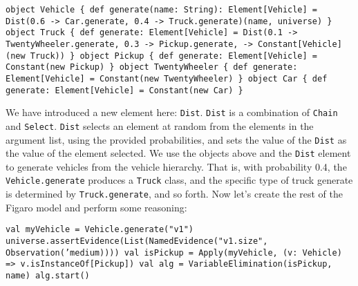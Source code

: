 \begin{flushleft}
\texttt{object Vehicle \{
\newline def generate(name: String): Element[Vehicle] =
\newline \tab Dist(0.6 -> Car.generate, 0.4 -> Truck.generate)(name, universe)
\newline \}
\newline object Truck \{
\newline \tab def generate: Element[Vehicle] =
\newline \tab Dist(0.1 -> TwentyWheeler.generate, 0.3 -> Pickup.generate,
\newline {} -> Constant[Vehicle](new Truck))
\newline \}
\newline object Pickup \{
\newline \tab def generate: Element[Vehicle] = Constant(new Pickup)
\newline \}
\newline object TwentyWheeler \{
\newline \tab def generate: Element[Vehicle] = Constant(new TwentyWheeler)
\newline \}
\newline object Car \{
\newline \tab def generate: Element[Vehicle] = Constant(new Car)
\newline \}}
\end{flushleft}

We have introduced a new element here: \texttt{Dist}. \texttt{Dist} is a combination of \texttt{Chain} and \texttt{Select}. \texttt{Dist} selects an element at random from the elements in the argument list, using the provided probabilities, and sets the value of the \texttt{Dist} as the value of the element selected. We use the objects above and the \texttt{Dist} element to generate vehicles from the vehicle hierarchy. That is, with probability 0.4, the \texttt{Vehicle.generate} produces a \texttt{Truck} class, and the specific type of truck generate is determined by \texttt{Truck.generate}, and so forth. Now let's create the rest of the Figaro model and perform some reasoning:

\begin{flushleft}
\texttt{val myVehicle = Vehicle.generate("v1")
\newline universe.assertEvidence(List(NamedEvidence("v1.size", Observation('medium))))
\newline val isPickup = Apply(myVehicle, (v: Vehicle) =>
\newline v.isInstanceOf[Pickup])
\newline val alg = VariableElimination(isPickup, name)
\newline alg.start()}
\end{flushleft}

